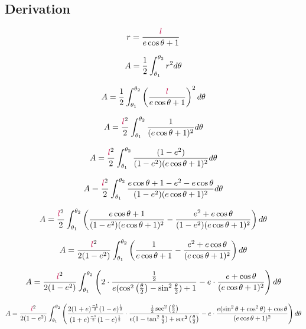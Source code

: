 \subsection{Derivation}
$$\textcolor{black}{r}=\frac{\textcolor{purple}{l}}{\textcolor{black}{e}\cos{\theta}+1}$$

$$A=\frac{1}{2}\int_{\theta_1}^{\theta_2}\textcolor{black}{r}^2d\theta$$

$$A=\frac{1}{2}\int_{\theta_1}^{\theta_2}\left(\frac{\textcolor{purple}{l}}{\textcolor{black}{e}\cos{\theta}+1}\right)^2d\theta$$

$$A=\frac{\textcolor{purple}{l}^2}{2}\int_{\theta_1}^{\theta_2}\frac{1}{(\textcolor{black}{e}\cos{\theta}+1)^2}d\theta$$

$$A=\frac{\textcolor{purple}{l}^2}{2}\int_{\theta_1}^{\theta_2}\frac{(1-\textcolor{black}{e}^2)}{(1-\textcolor{black}{e}^2)(\textcolor{black}{e}\cos{\theta}+1)^2}d\theta$$

$$A=\frac{\textcolor{purple}{l}^2}{2}\int_{\theta_1}^{\theta_2}\frac{\textcolor{black}{e}\cos{\theta}+1-\textcolor{black}{e}^2-\textcolor{black}{e}\cos{\theta}}{(1-\textcolor{black}{e}^2)(\textcolor{black}{e}\cos{\theta}+1)^2}d\theta$$

$$A=\frac{\textcolor{purple}{l}^2}{2}\int_{\theta_1}^{\theta_2}\left(\frac{\textcolor{black}{e}\cos{\theta}+1}{(1-\textcolor{black}{e}^2)(\textcolor{black}{e}\cos{\theta}+1)^2}
-\frac{\textcolor{black}{e}^2+\textcolor{black}{e}\cos{\theta}}{(1-\textcolor{black}{e}^2)(\textcolor{black}{e}\cos{\theta}+1)^2}\right)d\theta$$

$$A=\frac{\textcolor{purple}{l}^2}{2(1-\textcolor{black}{e}^2)}\int_{\theta_1}^{\theta_2}\left(\frac{1}{\textcolor{black}{e}\cos{\theta}+1}
-\frac{\textcolor{black}{e}^2+\textcolor{black}{e}\cos{\theta}}{(\textcolor{black}{e}\cos{\theta}+1)^2}\right)d\theta$$

$$A=\frac{\textcolor{purple}{l}^2}{2(1-\textcolor{black}{e}^2)}\int_{\theta_1}^{\theta_2}\left(
2\cdot\frac{\frac{1}{2}}{\textcolor{black}{e}(\cos^2{\left(\frac{\theta}{2}\right)}-\sin^2{\frac{\theta}{2}})+1}
-\textcolor{black}{e}\cdot\frac{\textcolor{black}{e}+\cos{\theta}}{(\textcolor{black}{e}\cos{\theta}+1)^2}\right)d\theta$$

$$A=\frac{\textcolor{purple}{l}^2}{2(1-\textcolor{black}{e}^2)}\int_{\theta_1}^{\theta_2}\left(
\frac{2(1+\textcolor{black}{e})^{\frac{-1}{2}}(1-\textcolor{black}{e})^{\frac{1}{2}}}{(1+\textcolor{black}{e})^{\frac{-1}{2}}(1-\textcolor{black}{e})^{\frac{1}{2}}}\cdot
\frac{\frac{1}{2}\sec^2{\left(\frac{\theta}{2}\right)}}{\textcolor{black}{e}(1-\tan^2{\frac{\theta}{2}})+\sec^2{\left(\frac{\theta}{2}\right)}}
-\textcolor{black}{e}\cdot\frac{\textcolor{black}{e}(\sin^2{\theta}+\cos^2{\theta})+\cos{\theta}}{(\textcolor{black}{e}\cos{\theta}+1)^2}\right)d\theta$$

